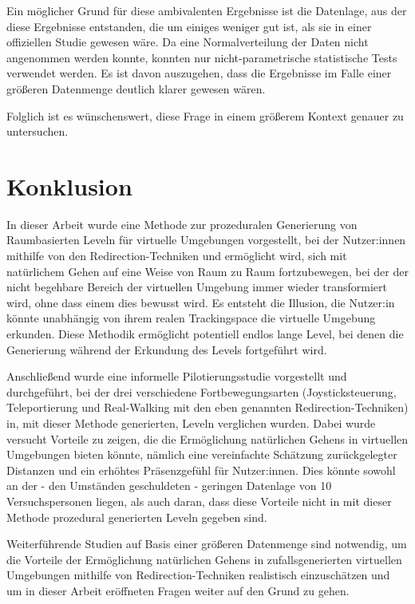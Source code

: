             Ein möglicher Grund für diese ambivalenten Ergebnisse ist die Datenlage, aus der diese Ergebnisse entstanden, die um einiges weniger gut ist, als sie in einer offiziellen Studie gewesen wäre. Da eine Normalverteilung der Daten nicht angenommen werden konnte, konnten nur nicht-parametrische statistische Tests verwendet werden.
            Es ist davon auszugehen, dass die Ergebnisse im Falle einer größeren Datenmenge deutlich klarer gewesen wären.

            Folglich ist es wünschenswert, diese Frage in einem größerem Kontext genauer zu untersuchen.

    \section{Konklusion}
        In dieser Arbeit wurde eine Methode zur prozeduralen Generierung von Raumbasierten Leveln für virtuelle Umgebungen vorgestellt, bei der  Nutzer:innen mithilfe von den Redirection-Techniken  und  ermöglicht wird, sich mit natürlichem Gehen auf eine Weise von Raum zu Raum fortzubewegen, bei der der nicht begehbare Bereich der virtuellen Umgebung immer wieder transformiert wird, ohne dass einem dies bewusst wird. Es entsteht die Illusion, die Nutzer:in könnte unabhängig von ihrem realen Trackingspace die virtuelle Umgebung erkunden. Diese Methodik ermöglicht potentiell endlos lange Level, bei denen die Generierung während der Erkundung des Levels fortgeführt wird.

        Anschließend wurde eine informelle Pilotierungsstudie vorgestellt und durchgeführt, bei der drei verschiedene Fortbewegungsarten (Joysticksteuerung, Teleportierung und Real-Walking mit den eben genannten Redirection-Techniken) in, mit dieser Methode generierten, Leveln verglichen wurden. Dabei wurde versucht Vorteile zu zeigen, die die Ermöglichung natürlichen Gehens in virtuellen Umgebungen bieten könnte, nämlich eine vereinfachte Schätzung zurückgelegter Distanzen und ein erhöhtes Präsenzgefühl für Nutzer:innen. Dies könnte sowohl an der - den Umständen geschuldeten - geringen Datenlage von 10 Versuchspersonen liegen, als auch daran, dass diese Vorteile nicht in mit dieser Methode prozedural generierten Leveln gegeben sind.

        Weiterführende Studien auf Basis einer größeren Datenmenge sind notwendig, um die Vorteile der Ermöglichung natürlichen Gehens in zufallsgenerierten virtuellen Umgebungen mithilfe von Redirection-Techniken realistisch einzuschätzen und um in dieser Arbeit eröffneten Fragen weiter auf den Grund zu gehen.

